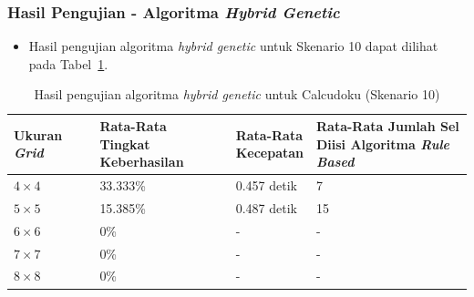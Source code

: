\documentclass{beamer}
\begin{document}
\begin{frame}
\frametitle{Hasil Pengujian - Algoritma \textit{Hybrid Genetic}}
\begin{itemize}
\item Hasil pengujian algoritma \textit{hybrid genetic} untuk Skenario 10 dapat dilihat pada Tabel~\ref{tab:pengujianhg10}.
\end{itemize}
\begin{table}
\tiny
\centering
\captionsetup{justification=centering}
\caption[Hasil pengujian algoritma \textit{hybrid genetic} untuk Calcudoku (Skenario 10)]{Hasil pengujian algoritma \textit{hybrid genetic} untuk Calcudoku (Skenario 10)}
\begin{tabular}{| l | l | l | l |}
\hline
Ukuran \textit{Grid} & \makecell[c]{Rata-Rata \\ Tingkat Keberhasilan} & \makecell[c]{Rata-Rata \\ Kecepatan} & \makecell[c]{Rata-Rata Jumlah Sel \\ Diisi Algoritma \textit{Rule Based}} \\
\hline \hline
\begin{math}4 \times 4\end{math} & 33.333\% & 0.457 detik & 7 \\
\hline
\begin{math}5 \times 5\end{math} & 15.385\% & 0.487 detik & 15 \\
\hline
\begin{math}6 \times 6\end{math} & 0\% & - & - \\
\hline
\begin{math}7 \times 7\end{math} & 0\% & - & - \\
\hline
\begin{math}8 \times 8\end{math} & 0\% & - & - \\
\hline
\end{tabular}
\label{tab:pengujianhg10}
\end{table}
\end{frame}

\end{document}

